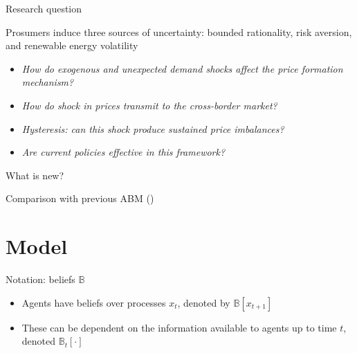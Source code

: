 \documentclass{beamer}
\newcommand{\B}{\mathbb{B}}
\begin{document}
\begin{frame}{Research question}

    Prosumers induce three sources of uncertainty: bounded rationality, risk aversion, and renewable energy volatility

    \begin{itemize} \setlength{\itemsep}{1em}
        \item \textit{How do exogenous and unexpected demand shocks affect the price formation mechanism?} \pause
        \item \textit{How do shock in prices transmit to the cross-border market?} \pause
        \item \textit{Hysteresis: can this shock produce sustained price imbalances?} \pause
        \item \textit{Are current policies effective in this framework?}
    \end{itemize}

\end{frame}

\begin{frame}{What is new?}

    Comparison with previous ABM (\cite{Weidlich2008})
    \vfill

    \hfill
\end{frame}

\section{Model}

\begin{frame}{Notation: beliefs $\B$}
    \begin{itemize} \setlength\itemsep{1.5em}
        \item Agents have beliefs over processes $x_t$, denoted by $\B[x_{t+1}]$
        \item These can be dependent on the information available to agents up to time $t$, denoted $\B_t[\cdot]$
    \end{itemize}
\end{frame}
\end{document}
